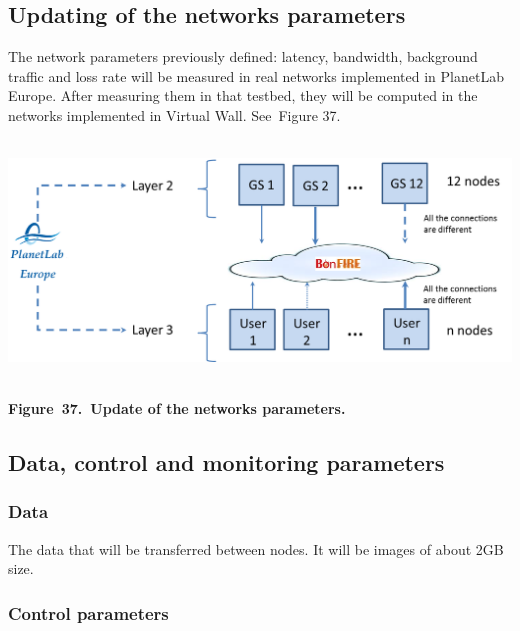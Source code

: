 \documentclass[a4paper]{article}
\begin{document}
\bigskip

\subsection[Updating of the networks parameters]{Updating of the
networks parameters}
\hypertarget{Toc381777235}{}
\bigskip

The network parameters previously defined: latency, bandwidth,
background traffic and loss rate will be measured in real networks
implemented in PlanetLab Europe. After measuring them in that testbed,
they will be computed in the networks implemented in Virtual Wall.
See\ Figure 37.


\bigskip


\bigskip

{\centering 
\includegraphics[width=6.18143in,height=2.50956in]{out-img45.png} \par}

{\centering\bfseries
\label{bkm:Ref378263310}Figure\ 37.\ Update of the networks parameters.
\par}


\bigskip

\subsection[Data, control and monitoring parameters]{Data, control and
monitoring parameters}
\hypertarget{Toc381777236}{}
\bigskip

\subsubsection[Data]{Data}
\hypertarget{Toc381777237}{}The data that will be transferred between
nodes. It will be images of about 2GB size.


\bigskip

\subsubsection[Control parameters]{Control parameters}
\hypertarget{Toc381777238}{}
\bigskip
\end{document}
